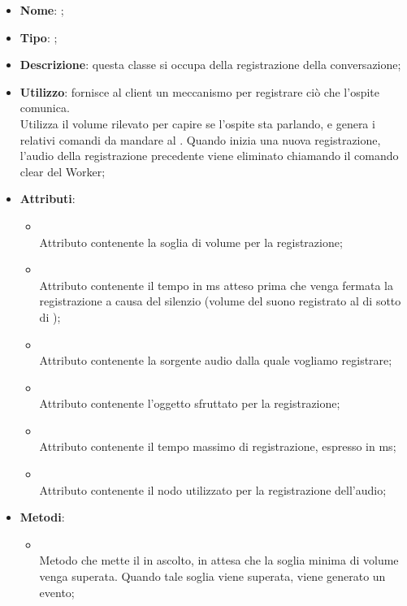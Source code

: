 \begin{itemize}
	\item \textbf{Nome}: ;
	\item \textbf{Tipo}: ;
	\item \textbf{Descrizione}: questa classe si occupa della registrazione della conversazione;
	\item \textbf{Utilizzo}: fornisce al client un meccanismo per registrare ciò che l'ospite comunica. \\
Utilizza il volume rilevato per capire se l'ospite sta parlando, e genera i relativi comandi da mandare al . Quando inizia una nuova registrazione, l'audio della registrazione precedente viene eliminato chiamando il comando clear del Worker;
	\item \textbf{Attributi}:
	\begin{itemize}
		\item[]  \\
		Attributo contenente la soglia di volume per la registrazione;
		\item[]  \\
		Attributo contenente il tempo in ms atteso prima che venga fermata la registrazione a causa del silenzio (volume del suono registrato al di sotto di );
		\item[]  \\
		Attributo contenente la sorgente audio dalla quale vogliamo registrare;
		\item[]  \\
		Attributo contenente l'oggetto  sfruttato per la registrazione;
		\item[]  \\
		Attributo contenente il tempo massimo di registrazione, espresso in ms;
		\item[]  \\
		Attributo contenente il nodo utilizzato per la registrazione dell'audio;
	\end{itemize}
	\item \textbf{Metodi}:
	\begin{itemize}
		\item[]  \\
		Metodo che mette il  in ascolto, in attesa che la soglia minima di volume venga superata. Quando tale soglia viene superata, viene generato un evento;\\

\end{itemize}
\end{itemize}
